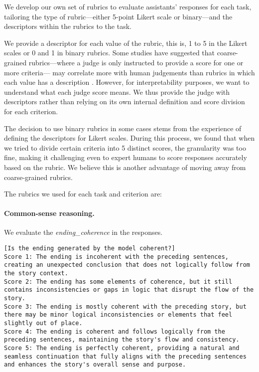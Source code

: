 We develop our own set of rubrics to evaluate
assistants' responses for each task, tailoring the type of rubric—either 5-point Likert scale or binary—and the descriptors within the rubrics to the task.

We provide a descriptor for each value of the rubric, this is, 1 to 5 in the Likert scales or 0 and 1 in binary rubrics. Some studies have suggested that coarse-grained rubrics—where a judge is only instructed to provide a score for one or more criteria— may correlate more with human judgements than rubrics in which each value has a description \citep{kim2024biggenbenchprincipledbenchmark}. However, for interpretability purposes, we want to understand what each judge score means. We thus provide the judge with descriptors rather than relying on its own internal definition and score division for each criterion.

The decision to use binary rubrics in some cases stems from the experience of defining the descriptors for Likert scales. During this process, we found that when we tried to divide certain criteria into 5 distinct scores, the granularity was too fine, making it challenging even to expert humans to score responses accurately based on the rubric. We believe this is another advantage of moving away from coarse-grained rubrics.

The rubrics we used for each task and criterion are:

\paragraph{Common-sense reasoning.} We evaluate the \emph{ending\_coherence} in the responses.
\begin{lstlisting}[label=lst:judge_rubrics_commonsens1,caption={Rubric used for the \emph{ending\_coherence} criterion.}]
[Is the ending generated by the model coherent?]
Score 1: The ending is incoherent with the preceding sentences, creating an unexpected conclusion that does not logically follow from the story context.
Score 2: The ending has some elements of coherence, but it still contains inconsistencies or gaps in logic that disrupt the flow of the story.
Score 3: The ending is mostly coherent with the preceding story, but there may be minor logical inconsistencies or elements that feel slightly out of place.
Score 4: The ending is coherent and follows logically from the preceding sentences, maintaining the story's flow and consistency.
Score 5: The ending is perfectly coherent, providing a natural and seamless continuation that fully aligns with the preceding sentences and enhances the story's overall sense and purpose.
\end{lstlisting}

